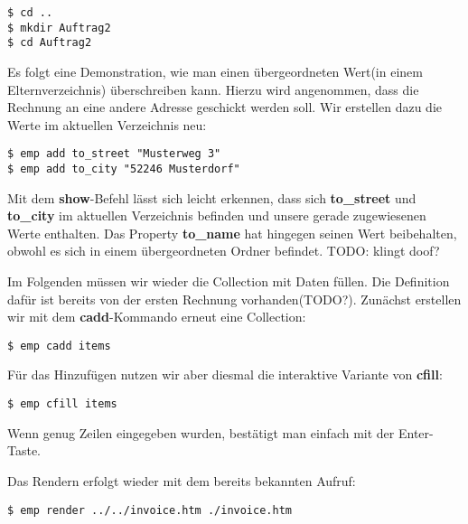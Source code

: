 \begin{lstlisting}[style=Bash]
$ cd ..
$ mkdir Auftrag2
$ cd Auftrag2
\end{lstlisting}

Es folgt eine Demonstration, wie man einen übergeordneten Wert(in einem Elternverzeichnis) überschreiben kann. Hierzu wird angenommen, dass die Rechnung an eine andere Adresse geschickt werden soll. Wir erstellen dazu die Werte im aktuellen Verzeichnis neu:

\begin{lstlisting}[style=Bash]
$ emp add to_street "Musterweg 3"
$ emp add to_city "52246 Musterdorf"
\end{lstlisting}

Mit dem \textbf{show}-Befehl lässt sich leicht erkennen, dass sich \textbf{to\_street} und \textbf{to\_city} im aktuellen Verzeichnis befinden und unsere gerade zugewiesenen Werte enthalten.
Das Property \textbf{to\_name} hat hingegen seinen Wert beibehalten, obwohl es sich in einem übergeordneten Ordner befindet. TODO: klingt doof?

Im Folgenden müssen wir wieder die Collection mit Daten füllen. Die Definition dafür ist bereits von der ersten Rechnung vorhanden(TODO?). Zunächst erstellen wir mit dem \textbf{cadd}-Kommando erneut eine Collection:
\begin{lstlisting}[style=Bash]
$ emp cadd items
\end{lstlisting}

Für das Hinzufügen nutzen wir aber diesmal die interaktive Variante von \textbf{cfill}:
\begin{lstlisting}[style=Bash]
$ emp cfill items
\end{lstlisting}
Wenn genug Zeilen eingegeben wurden, bestätigt man einfach mit der Enter-Taste.

Das Rendern erfolgt wieder mit dem bereits bekannten Aufruf:

\begin{lstlisting}[style=Bash]
$ emp render ../../invoice.htm ./invoice.htm
\end{lstlisting}
